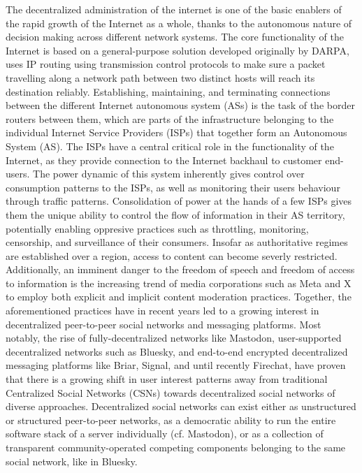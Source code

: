 The decentralized administration of the internet is one of the basic enablers of the rapid growth of the Internet as a whole, thanks to the autonomous nature of decision making across different network systems. The core functionality of the Internet is based on a general-purpose solution developed originally by DARPA, uses IP routing using transmission control protocols to make sure a packet travelling along a network path between two distinct hosts will reach its destination reliably.
Establishing, maintaining, and terminating connections between the different Internet autonomous system (ASs) is the task of the border routers between them, which are parts of the infrastructure belonging to the individual Internet Service Providers (ISPs) that together form an Autonomous System (AS).
The ISPs have a central critical role in the functionality of the Internet, as they provide connection to the Internet backhaul to customer end-users. The power dynamic of this system inherently gives control over consumption patterns to the ISPs, as well as monitoring their users behaviour through traffic patterns.
Consolidation of power at the hands of a few ISPs gives them the unique ability to control the flow of information in their AS territory, potentially enabling oppresive practices such as throttling, monitoring, censorship, and surveillance of their consumers. Insofar as authoritative regimes are established over a region, access to content can become severly restricted.
Additionally, an imminent danger to the freedom of speech and freedom of access to information is the increasing trend of media corporations such as Meta and X to employ both explicit and implicit content moderation practices.
Together, the aforementioned practices have in recent years led to a growing interest in decentralized peer-to-peer social networks and messaging platforms. Most notably, the rise of fully-decentralized networks like Mastodon, user-supported decentralized networks such as Bluesky, and end-to-end encrypted decentralized messaging platforms like Briar, Signal, and until recently Firechat, have proven that there is a growing shift in user interest patterns away from traditional Centralized Social Networks (CSNs) towards decentralized social networks of diverse approaches. 
Decentralized social networks can exist either as unstructured or structured peer-to-peer networks, as a democratic ability to run the entire software stack of a server individually (cf. Mastodon), or as a collection of transparent community-operated competing components belonging to the same social network, like in Bluesky.
